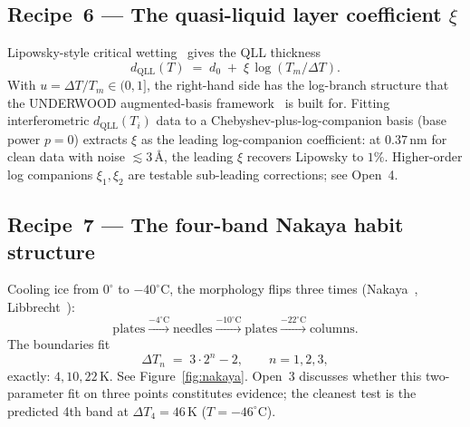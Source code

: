 \documentclass[final]{siamltex}
\begin{document}
\subsection{Recipe~6 --- The quasi-liquid layer coefficient $\xi$}

Lipowsky-style critical wetting~\cite{Lipowsky1982} gives the
QLL thickness
\[
d_{\text{QLL}}(T) \;=\; d_0 \;+\; \xi \, \log(T_m/\Delta T).
\]
With $u = \Delta T/T_m \in (0,1]$, the right-hand side has the
log-branch structure that the UNDERWOOD augmented-basis
framework~\cite{Underwood2026} is built for.  Fitting interferometric
$d_{\text{QLL}}(T_i)$ data to a Chebyshev-plus-log-companion basis
(base power $p=0$) extracts $\xi$ as the leading log-companion
coefficient: at $0.37$\,nm for clean data with noise $\lesssim
3$\,\AA, the leading $\xi$ recovers Lipowsky to $1\%$.  Higher-order
log companions $\xi_1, \xi_2$ are testable sub-leading corrections;
see Open~4.

\subsection{Recipe~7 --- The four-band Nakaya habit structure}

Cooling ice from $0^{\circ}$ to $-40^{\circ}$C, the morphology
flips three times (Nakaya~\cite{Nakaya1954},
Libbrecht~\cite{Libbrecht2005}):
\[
\text{plates} \xrightarrow{-4^{\circ}\text{C}}
\text{needles} \xrightarrow{-10^{\circ}\text{C}}
\text{plates} \xrightarrow{-22^{\circ}\text{C}}
\text{columns}.
\]
The boundaries fit
\[
\Delta T_n \;=\; 3 \cdot 2^n - 2, \qquad n = 1, 2, 3,
\]
exactly: $4, 10, 22$\,K.  See Figure~\ref{fig:nakaya}.  Open~3
discusses whether this two-parameter fit on three points
constitutes evidence; the cleanest test is the predicted 4th band
at $\Delta T_4 = 46$\,K ($T = -46^{\circ}$C).
\end{document}
